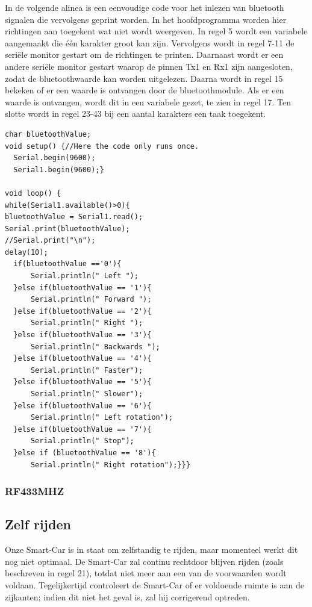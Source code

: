 In de volgende alinea is een eenvoudige code voor het inlezen van bluetooth signalen die vervolgens geprint worden. In het hoofdprogramma worden hier richtingen aan toegekent wat niet wordt weergeven. In regel 5 wordt een variabele aangemaakt die één karakter groot kan zijn. Vervolgens wordt in regel 7-11 de seriële monitor gestart om de richtingen te printen. Daarnaast wordt er een andere seriële monitor gestart waarop de pinnen Tx1 en Rx1 zijn aangesloten, zodat de bluetoothwaarde kan worden uitgelezen. Daarna wordt in regel 15 bekeken of er een waarde is ontvangen door de bluetoothmodule. Als er een waarde is ontvangen, wordt dit in een variabele gezet, te zien in regel 17. Ten slotte wordt in regel 23-43 bij een aantal karakters een taak toegekent.
\newpage
\begin{lstlisting}
char bluetoothValue;
void setup() {//Here the code only runs once.
  Serial.begin(9600);
  Serial1.begin(9600);}

void loop() {
while(Serial1.available()>0){ 
bluetoothValue = Serial1.read();
Serial.print(bluetoothValue);
//Serial.print("\n");
delay(10);
  if(bluetoothValue =='0'){
      Serial.println(" Left ");
  }else if(bluetoothValue == '1'){
      Serial.println(" Forward ");
  }else if(bluetoothValue == '2'){
      Serial.println(" Right ");
  }else if(bluetoothValue == '3'){
      Serial.println(" Backwards ");
  }else if(bluetoothValue == '4'){
      Serial.println(" Faster");
  }else if(bluetoothValue == '5'){
      Serial.println(" Slower");
  }else if(bluetoothValue == '6'){
      Serial.println(" Left rotation");
  }else if(bluetoothValue == '7'){
      Serial.println(" Stop");
  }else if (bluetoothValue == '8'){
      Serial.println(" Right rotation");}}}
\end{lstlisting}
\subsubsection{RF433MHZ}

\subsection{Zelf rijden}
Onze \gls{Smart-Car} is in staat om zelfstandig te rijden, maar momenteel werkt dit nog niet optimaal. De \gls{Smart-Car} zal continu rechtdoor blijven rijden (zoals beschreven in regel 21), totdat niet meer aan een van de voorwaarden wordt voldaan. Tegelijkertijd controleert de \gls{Smart-Car} of er voldoende ruimte is aan de zijkanten; indien dit niet het geval is, zal hij corrigerend optreden.

